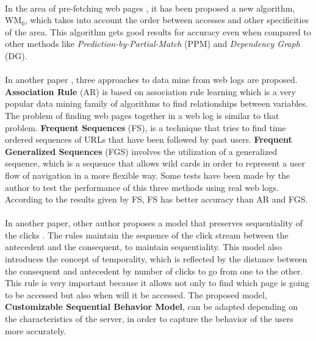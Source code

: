 \paragraph{}

In the area of pre-fetching web pages \cite{Nanopoulos01effectiveprediction}, it
has been proposed a new algorithm, WM\begin{math}_0\end{math}, which takes into
account the order between accesses and other specificities of the area. This
algorithm gets good results for accuracy even when compared to other methods
like \emph{Prediction-by-Partial-Match} (PPM) and \emph{Dependency Graph} (DG).

\paragraph{}

In another paper \cite{Gery:2003:EWU:956699.956716}, three approaches to
data mine from web logs are proposed. \textbf{Association Rule} (AR) is based on association rule
learning which is a very popular data mining family of algorithms to find relationships between
variables. The problem of finding web pages together in a web log is similar to
that problem. \textbf{Frequent Sequences} (FS), is a technique that tries to find time
ordered sequences of URLs that have been followed by past users.
\textbf{Frequent Generalized Sequences} (FGS) involves the utilization of a
generalized sequence, which is a
sequence that allows wild cards in order to represent a user flow of
navigation in a more flexible way. 
Some tests have been made by the author \cite{Gery:2003:EWU:956699.956716} to
test the performance of this three methods using real web logs. According to the
results given by FS, FS has better accuracy than AR and FGS.

\paragraph{}

In another paper, other author proposes a model that preserves sequentiality of
the clicks \cite{Frias-Martinez2003}. The rules maintain the sequence of the
click stream between the antecedent and the consequent, to maintain sequentiality.
This model also introduces the concept of temporality, which is reflected by the
distance between the consequent and antecedent by number of clicks to go from one
to the other. This rule is very important because it allows not only to find
which page is  going to be accessed but also when will it be accessed. The proposed
model, \textbf{Customizable Sequential Behavior Model}, can be adapted depending
on the characteristics of the server, in order to capture the behavior of the
users more accurately.

